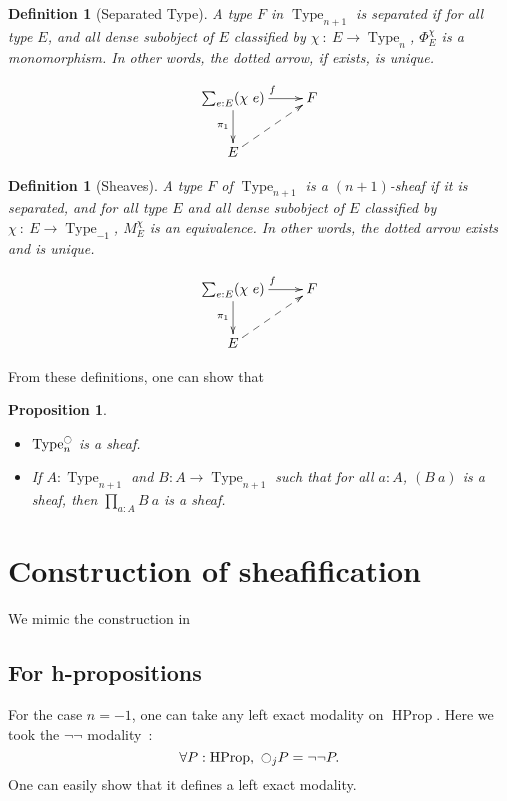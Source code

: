 \documentclass[conference]{IEEEtran}
\newtheorem{prop}[thm]{Proposition}
\newtheorem{defi}[thm]{Definition}
\DeclareMathOperator{\Type}{Type}
\DeclareMathOperator{\HProp}{HProp}
\newcommand{\modal}{\ensuremath{\ocircle}}
\begin{document}
\begin{defi}[Separated Type]
  A type $F$ in $\Type_{n+1}$ is {\em separated} if for all type $E$, and
  all dense subobject of $E$ classified by $\chi~:~E \to \Type_n$,
  $\Phi_E^\chi$ is a monomorphism. In other words, the dotted arrow,
  if exists, is unique.

  $$\xymatrix{
    \sum_{e:E} (\chi~ e) \ar[r]^f \ar[d]_{\pi_1} & F \\
    E \ar@{-->}[ru]&
  }$$
\end{defi}

\begin{defi}[Sheaves]
  A type $F$ of $\Type_{n+1}$ is a {\em $(n+1)$-sheaf} if it is
  separated, and for all type $E$ and all dense subobject of $E$
  classified by $\chi~:~E \to \Type_{-1}$, $M_E^\chi$ is an
  equivalence. In other words, the dotted arrow exists and is unique.

  $$\xymatrix{
    \sum_{e:E} (\chi~ e) \ar[r]^f \ar[d]_{\pi_1} & F \\
    E \ar@{-->}[ru]&
  }$$
\end{defi}

From these definitions, one can show that
\begin{prop}\label{prop:sheaf_prop}
  \begin{itemize}
  \item $\Type_n^\modal$ is a sheaf.
  \item If $A:\Type_{n+1}$ and $B:A \to \Type_{n+1}$ such that for all
    $a:A$, $(B~a)$ is a sheaf, then $\prod_{a:A}B~a$ is a sheaf.
  \end{itemize}
\end{prop}



\section{Construction of sheafification}
\label{sec:sheafification}

We mimic the construction in~\cite{maclanemoerdijk}

\subsection{For h-propositions}
\label{ssec:h-propositions}

For the case $n=-1$, one can take any left exact modality on
$\HProp$. Here we took the $\lnot\lnot$ modality~:
$$\forall P:\HProp,~\modal_j P = \lnot\lnot P.$$
One can easily show that it defines a left exact modality.
\end{document}
